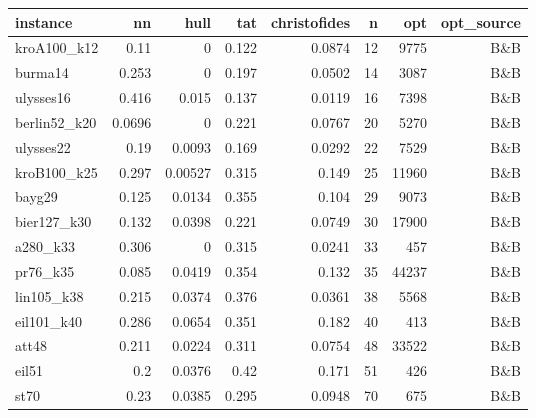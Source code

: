 \begin{tabular}{lrrrrrrr}
\hline
instance & nn & hull & tat & christofides & n & opt & opt\_source \\
\hline
kroA100\_k12 & 0.11 & 0 & 0.122 & 0.0874 & 12 & 9775 & B\&B \\
burma14 & 0.253 & 0 & 0.197 & 0.0502 & 14 & 3087 & B\&B \\
ulysses16 & 0.416 & 0.015 & 0.137 & 0.0119 & 16 & 7398 & B\&B \\
berlin52\_k20 & 0.0696 & 0 & 0.221 & 0.0767 & 20 & 5270 & B\&B \\
ulysses22 & 0.19 & 0.0093 & 0.169 & 0.0292 & 22 & 7529 & B\&B \\
kroB100\_k25 & 0.297 & 0.00527 & 0.315 & 0.149 & 25 & 11960 & B\&B \\
bayg29 & 0.125 & 0.0134 & 0.355 & 0.104 & 29 & 9073 & B\&B \\
bier127\_k30 & 0.132 & 0.0398 & 0.221 & 0.0749 & 30 & 17900 & B\&B \\
a280\_k33 & 0.306 & 0 & 0.315 & 0.0241 & 33 & 457 & B\&B \\
pr76\_k35 & 0.085 & 0.0419 & 0.354 & 0.132 & 35 & 44237 & B\&B \\
lin105\_k38 & 0.215 & 0.0374 & 0.376 & 0.0361 & 38 & 5568 & B\&B \\
eil101\_k40 & 0.286 & 0.0654 & 0.351 & 0.182 & 40 & 413 & B\&B \\
att48 & 0.211 & 0.0224 & 0.311 & 0.0754 & 48 & 33522 & B\&B \\
eil51 & 0.2 & 0.0376 & 0.42 & 0.171 & 51 & 426 & B\&B \\
st70 & 0.23 & 0.0385 & 0.295 & 0.0948 & 70 & 675 & B\&B \\
\hline
\end{tabular}
